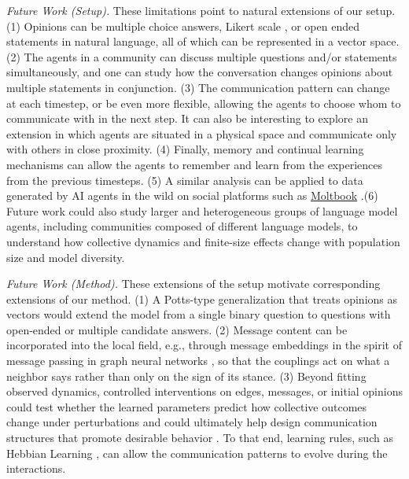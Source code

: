 \textit{Future Work (Setup).} These limitations point to natural extensions of our setup. (1) Opinions can be multiple choice answers, Likert scale \citep{likert1932}, or open ended statements in natural language, all of which can be represented in a vector space. (2) The agents in a community can discuss multiple questions and/or statements simultaneously, and one can study how the conversation changes opinions about multiple statements in conjunction. (3) The communication pattern can change at each timestep, or be even more flexible, allowing the agents to choose whom to communicate with in the next step. It can also be interesting to explore an extension in which agents are situated in a physical space and communicate only with others in close proximity. (4) Finally, memory and continual learning mechanisms can allow the agents to remember and learn from the experiences from the previous timesteps. (5) A similar analysis can be applied to data generated by AI agents in the wild on social platforms such as \href{https://www.moltbook.com/}{Moltbook} \citep{moltbook_observatory_archive_2026}.(6) Future work could also study larger and heterogeneous groups of language model agents, including communities composed of different language models, to understand how collective dynamics and finite-size effects change with population size and model diversity.
 
\textit{Future Work (Method).}  These extensions of the setup motivate corresponding extensions of our method. (1) A Potts-type generalization \citep{potts1952, wu1982potts} that treats opinions as vectors would extend the model from a single binary question to questions with open-ended or multiple candidate answers. (2) Message content can be incorporated into the local field, e.g., through message embeddings in the spirit of message passing in graph neural networks \citep{scarselli2009gnn, gilmer2017mpnn}, so that the couplings act on what a neighbor says rather than only on the sign of its stance. (3)  Beyond fitting observed dynamics, controlled interventions on edges, messages, or initial opinions could test whether the learned parameters predict how collective outcomes change under perturbations and could ultimately help design communication structures that promote desirable behavior \citep{hu2025automateddesignagenticsystems}.  To that end, learning rules, such as Hebbian Learning \citep{hebb1949organization}, can allow the communication patterns to evolve during the interactions.

